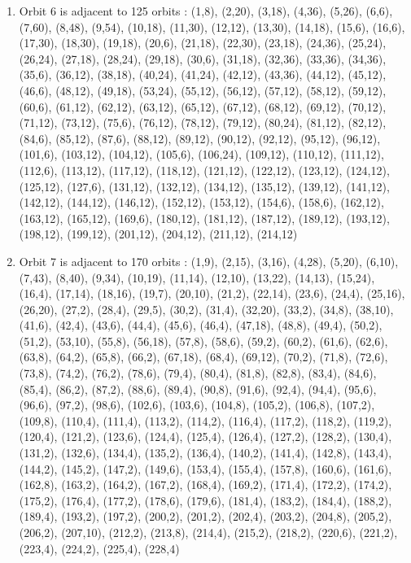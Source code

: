 \documentclass[12pt]{article}
\begin{document}
\begin{enumerate}
\item Orbit 6 is adjacent to 125 orbits : (1,8), (2,20), (3,18), (4,36), (5,26), (6,6), (7,60), (8,48), (9,54), (10,18), (11,30), (12,12), (13,30), (14,18), (15,6), (16,6), (17,30), (18,30), (19,18), (20,6), (21,18), (22,30), (23,18), (24,36), (25,24), (26,24), (27,18), (28,24), (29,18), (30,6), (31,18), (32,36), (33,36), (34,36), (35,6), (36,12), (38,18), (40,24), (41,24), (42,12), (43,36), (44,12), (45,12), (46,6), (48,12), (49,18), (53,24), (55,12), (56,12), (57,12), (58,12), (59,12), (60,6), (61,12), (62,12), (63,12), (65,12), (67,12), (68,12), (69,12), (70,12), (71,12), (73,12), (75,6), (76,12), (78,12), (79,12), (80,24), (81,12), (82,12), (84,6), (85,12), (87,6), (88,12), (89,12), (90,12), (92,12), (95,12), (96,12), (101,6), (103,12), (104,12), (105,6), (106,24), (109,12), (110,12), (111,12), (112,6), (113,12), (117,12), (118,12), (121,12), (122,12), (123,12), (124,12), (125,12), (127,6), (131,12), (132,12), (134,12), (135,12), (139,12), (141,12), (142,12), (144,12), (146,12), (152,12), (153,12), (154,6), (158,6), (162,12), (163,12), (165,12), (169,6), (180,12), (181,12), (187,12), (189,12), (193,12), (198,12), (199,12), (201,12), (204,12), (211,12), (214,12)
\item Orbit 7 is adjacent to 170 orbits : (1,9), (2,15), (3,16), (4,28), (5,20), (6,10), (7,43), (8,40), (9,34), (10,19), (11,14), (12,10), (13,22), (14,13), (15,24), (16,4), (17,14), (18,16), (19,7), (20,10), (21,2), (22,14), (23,6), (24,4), (25,16), (26,20), (27,2), (28,4), (29,5), (30,2), (31,4), (32,20), (33,2), (34,8), (38,10), (41,6), (42,4), (43,6), (44,4), (45,6), (46,4), (47,18), (48,8), (49,4), (50,2), (51,2), (53,10), (55,8), (56,18), (57,8), (58,6), (59,2), (60,2), (61,6), (62,6), (63,8), (64,2), (65,8), (66,2), (67,18), (68,4), (69,12), (70,2), (71,8), (72,6), (73,8), (74,2), (76,2), (78,6), (79,4), (80,4), (81,8), (82,8), (83,4), (84,6), (85,4), (86,2), (87,2), (88,6), (89,4), (90,8), (91,6), (92,4), (94,4), (95,6), (96,6), (97,2), (98,6), (102,6), (103,6), (104,8), (105,2), (106,8), (107,2), (109,8), (110,4), (111,4), (113,2), (114,2), (116,4), (117,2), (118,2), (119,2), (120,4), (121,2), (123,6), (124,4), (125,4), (126,4), (127,2), (128,2), (130,4), (131,2), (132,6), (134,4), (135,2), (136,4), (140,2), (141,4), (142,8), (143,4), (144,2), (145,2), (147,2), (149,6), (153,4), (155,4), (157,8), (160,6), (161,6), (162,8), (163,2), (164,2), (167,2), (168,4), (169,2), (171,4), (172,2), (174,2), (175,2), (176,4), (177,2), (178,6), (179,6), (181,4), (183,2), (184,4), (188,2), (189,4), (193,2), (197,2), (200,2), (201,2), (202,4), (203,2), (204,8), (205,2), (206,2), (207,10), (212,2), (213,8), (214,4), (215,2), (218,2), (220,6), (221,2), (223,4), (224,2), (225,4), (228,4)

\end{enumerate}
\end{document}
